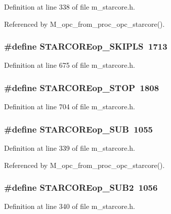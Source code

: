 Definition at line 338 of file m\_\-starcore.h.

Referenced by M\_\-opc\_\-from\_\-proc\_\-opc\_\-starcore().
\subsubsection{\setlength{\rightskip}{0pt plus 5cm}\#define STARCOREop\_\-SKIPLS~1713}\label{m__starcore_8h_613ab39041c6958ac466245b4bab71e7}




Definition at line 675 of file m\_\-starcore.h.
\subsubsection{\setlength{\rightskip}{0pt plus 5cm}\#define STARCOREop\_\-STOP~1808}\label{m__starcore_8h_8c9e7e612b5c3a12e6e9af3021c56fb5}




Definition at line 704 of file m\_\-starcore.h.
\subsubsection{\setlength{\rightskip}{0pt plus 5cm}\#define STARCOREop\_\-SUB~1055}\label{m__starcore_8h_6d786e1e904ac74d6e8c86976c34e549}




Definition at line 339 of file m\_\-starcore.h.

Referenced by M\_\-opc\_\-from\_\-proc\_\-opc\_\-starcore().
\subsubsection{\setlength{\rightskip}{0pt plus 5cm}\#define STARCOREop\_\-SUB2~1056}\label{m__starcore_8h_0f66468918e79a51d23671dac02ece4b}




Definition at line 340 of file m\_\-starcore.h.

